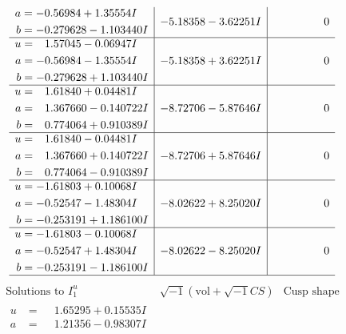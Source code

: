 \documentclass[1p]{elsarticle_modified}
\theoremstyle{definition}
\newcommand{\I}{\sqrt{-1}}
\begin{document}
$$\begin{array}{c|c|c}
\begin{aligned}
a &= -0.56984 + 1.35554 I \\
b &= -0.279628 - 1.103440 I\end{aligned}
 & -5.18358 - 3.62251 I & \phantom{-0.000000 } 0 \\ \hline\begin{aligned}
u &= \phantom{-}1.57045 - 0.06947 I \\
a &= -0.56984 - 1.35554 I \\
b &= -0.279628 + 1.103440 I\end{aligned}
 & -5.18358 + 3.62251 I & \phantom{-0.000000 } 0 \\ \hline\begin{aligned}
u &= \phantom{-}1.61840 + 0.04481 I \\
a &= \phantom{-}1.367660 - 0.140722 I \\
b &= \phantom{-}0.774064 + 0.910389 I\end{aligned}
 & -8.72706 - 5.87646 I & \phantom{-0.000000 } 0 \\ \hline\begin{aligned}
u &= \phantom{-}1.61840 - 0.04481 I \\
a &= \phantom{-}1.367660 + 0.140722 I \\
b &= \phantom{-}0.774064 - 0.910389 I\end{aligned}
 & -8.72706 + 5.87646 I & \phantom{-0.000000 } 0 \\ \hline\begin{aligned}
u &= -1.61803 + 0.10068 I \\
a &= -0.52547 - 1.48304 I \\
b &= -0.253191 + 1.186100 I\end{aligned}
 & -8.02622 + 8.25020 I & \phantom{-0.000000 } 0 \\ \hline\begin{aligned}
u &= -1.61803 - 0.10068 I \\
a &= -0.52547 + 1.48304 I \\
b &= -0.253191 - 1.186100 I\end{aligned}
 & -8.02622 - 8.25020 I & \phantom{-0.000000 } 0\\
 \hline 
 \end{array}$$\newpage$$\begin{array}{c|c|c}  
\text{Solutions to }I^u_{1}& \I (\text{vol} + \sqrt{-1}CS) & \text{Cusp shape}\\
 \hline 
\begin{aligned}
u &= \phantom{-}1.65295 + 0.15535 I \\
a &= \phantom{-}1.21356 - 0.98307 I \\

\end{aligned}
\end{array}$$
\end{document}
